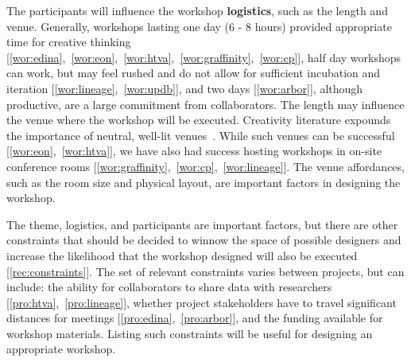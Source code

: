 

The participants will influence the workshop {\bf logistics}, such as the length and venue. Generally, workshops lasting one day (6 - 8 hours) provided appropriate time for creative thinking [\ref{wor:edina},~\ref{wor:eon},~\ref{wor:htva},~\ref{wor:graffinity},~\ref{wor:cp}], half day workshops can work, but may feel rushed and do not allow for sufficient incubation and iteration [\ref{wor:lineage},~\ref{wor:updb}], and two days [\ref{wor:arbor}], although productive, are a large commitment from collaborators. The length may influence the venue where the workshop will be executed. Creativity literature expounds the importance of neutral, well-lit venues~\cite{CreativeEducationFoundation2015,Isaksen2000}. While such venues can be successful [\ref{wor:eon},~\ref{wor:htva}], we have also had success hosting workshops in on-site conference rooms  [\ref{wor:graffinity},~\ref{wor:cp},~\ref{wor:lineage}]. The venue affordances, such as the room size and physical layout, are important factors in designing the workshop. 

The theme, logistics, and participants are important factors, but there are other constraints that should be decided to winnow the space of possible designers and increase the likelihood that the workshop designed will also be executed [\ref{rec:constraints}]. The set of relevant constraints varies between projects, but can include: the ability for collaborators to share data with researchers [\ref{pro:htva},~\ref{pro:lineage}], whether project stakeholders have to travel significant distances for meetings [\ref{pro:edina},~\ref{pro:arbor}], and the funding available for workshop materials. Listing such constraints will be useful for designing an appropriate workshop.

